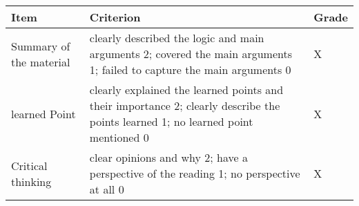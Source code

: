 \documentclass[11pt,]{article}
\theoremstyle{definition}
\theoremstyle{definition}
\theoremstyle{remark}
\begin{document}
\begin{longtable}[]{@{}lll@{}}
\toprule
\begin{minipage}[b]{0.15\columnwidth}\raggedright\strut
Item\strut
\end{minipage} & \begin{minipage}[b]{0.72\columnwidth}\raggedright\strut
Criterion\strut
\end{minipage} & \begin{minipage}[b]{0.05\columnwidth}\raggedright\strut
Grade\strut
\end{minipage}\tabularnewline
\midrule
\endhead
\begin{minipage}[t]{0.15\columnwidth}\raggedright\strut
Summary of the material\strut
\end{minipage} & \begin{minipage}[t]{0.72\columnwidth}\raggedright\strut
clearly described the logic and main arguments 2; covered the main
arguments 1; failed to capture the main arguments 0\strut
\end{minipage} & \begin{minipage}[t]{0.05\columnwidth}\raggedright\strut
X\strut
\end{minipage}\tabularnewline
\begin{minipage}[t]{0.15\columnwidth}\raggedright\strut
learned Point\strut
\end{minipage} & \begin{minipage}[t]{0.72\columnwidth}\raggedright\strut
clearly explained the learned points and their importance 2; clearly
describe the points learned 1; no learned point mentioned 0\strut
\end{minipage} & \begin{minipage}[t]{0.05\columnwidth}\raggedright\strut
X\strut
\end{minipage}\tabularnewline
\begin{minipage}[t]{0.15\columnwidth}\raggedright\strut
Critical thinking\strut
\end{minipage} & \begin{minipage}[t]{0.72\columnwidth}\raggedright\strut
clear opinions and why 2; have a perspective of the reading 1; no
perspective at all 0\strut
\end{minipage} & \begin{minipage}[t]{0.05\columnwidth}\raggedright\strut
X\strut
\end{minipage}\tabularnewline
\bottomrule
\end{longtable}

\clearpage
\end{document}

